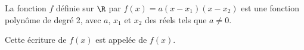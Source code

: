 \begin{Propriete}
    La fonction $f$ définie sur $\R$ par $f(x)=a(x-x_1)(x-x_2)$ est une fonction polynôme de degré 2, avec $a$, $x_1$ et $x_2$ des réels tels que $a\neq 0$.
    
    Cette écriture de $f(x)$ est appelée de $f(x)$.
\end{Propriete}